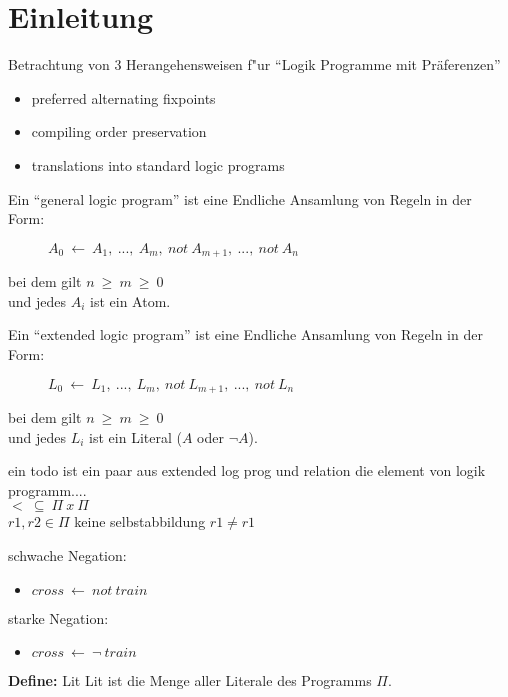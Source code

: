 \section{Einleitung}

Betrachtung von 3 Herangehensweisen f"ur ``Logik Programme mit Präferenzen''
\begin{itemize}
  \item preferred alternating fixpoints
  \item compiling order preservation
  \item translations into standard logic programs
\end{itemize}


Ein ``general logic program'' ist eine Endliche Ansamlung von Regeln in der Form:
\begin{figure}
  \begin{math}
    A_0~\leftarrow~A_1,~...,~A_m,~not~A_{m+1},~...,~not~A_n
  \end{math}
\end{figure}
bei dem gilt $n~\geq~m~\geq~0$\\[0.5cm]
und jedes $A_i$ ist ein Atom.


Ein ``extended logic program'' ist eine Endliche Ansamlung von Regeln in der Form:
\begin{figure}
  \begin{math}
    L_0~\leftarrow~L_1,~...,~L_m,~not~L_{m+1},~...,~not~L_n
  \end{math}
\end{figure}
bei dem gilt $n~\geq~m~\geq~0$\\[0.5cm]
und jedes $L_i$ ist ein Literal ($A$ oder $\neg A$).


ein todo ist ein paar aus extended log prog und relation die element von logik programm....\\
$<~\subseteq~\Pi~x~\Pi$\\
$r1, r2 \in \Pi$
keine selbstabbildung $r1 \neq r1$


schwache Negation:
\begin{itemize}
  \item $cross~\leftarrow~not~train$
\end{itemize}
starke Negation:
\begin{itemize}
  \item $cross~\leftarrow~\neg~train$
\end{itemize}


{\textbf{Define:} Lit}
  Lit ist die Menge aller Literale des Programms $\Pi$.

